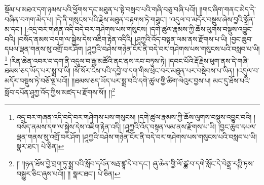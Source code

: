 སྡོམ་པ་མཐའ་དག་ཉམས་པའི་ཕྱོགས་དང་མཐུན་པ་སྟེ་བསླབ་པའི་གཞི་བཅུ་བཞི་པའོ།། །།གང་ཞིག་གནང་མེད་དེ་བཞིན་བཀག་མེད་པ། །དེ་ནི་གསུངས་པའི་རྗེས་མཐུན་བརྟགས་ཏེ་གཟུང་། །འདུལ་བ་མདོར་བསྡུས་ཞེས་བྱའི་སྒྲོན་མ་དང་། །:འདྲ་བར་གཞན་འདི་བདེ་བར་གཤེགས་པས་གསུངས། །དགེ་ཚུལ་རྣམས་ཀྱི་ཆོས་ལུགས་བསྡུས་འབྱུང་བའི། །བསོད་ནམས་བདག་ལ་སྐྱེས་དེས་འཇིག་རྟེན་འདིའི། །ཤཱཀྱའི་འོད་བསྟན་ལམ་ནས་རྫོགས་པ་ཡི། །བྱང་ཆུབ་དཔལ་ལྡན་གནས་སུ་འགྲོ་བར་ཤོག །ཤཱཀྱའི་བཤེས་གཉེན་ངོར་ནི་བདེ་བར་གཤེགས་པས་གསུངས་པའི་བསླབ་པ་ཡི།\footnote{འདྲ་བར་གཞན་འདི་བདེ་བར་གཤེགས་པས་གསུངས། །དགེ་ཚུལ་རྣམས་ཀྱི་ཆོས་ལུགས་བསྡུས་འབྱུང་བའི། །བསོད་ནམས་དག་ལ་སྐྱེས་དེས་འཇིག་རྟེན་འདི། །ཤཱཀྱའི་འོད་བསྟན་ལམ་ནས་རྫོགས་པ་ཡི། །བྱང་ཆུབ་དཔལ་ལྡན་གནས་སུ་འགྲོ་བར་ཤོག །ཤཱཀྱའི་བཤེས་གཉེན་ངོར་ནི་བདེ་བར་གཤེགས་པས་གསུངས་པའི་བསླབ་པ་ཡི།  སྣར་ཐང་།  པེ་ཅིན། } །རིན་ཆེན་འབར་བ་དག་ནི་འདུལ་བ་རྒྱ་མཚོའི་ནང་ནས་རབ་བཏུས་ཏེ། །དབང་པོའི་རྡོ་རྗེས་ཕུག་ནས་དེ་གཞི་ཐམས་ཅད་ཡོད་པར་སྨྲ་བ་ཡི། །སོ་སོར་ངེས་པའི་དབྱེ་བ་དག་གིས་ཕྲེང་བར་མཐུན་པར་བསྡེབས་པ་ཡིན། །འདུལ་བ་མདོར་བསྡུས་ཏེ་བཅོ་ལྔ་པའོ།། །།ཐམས་ཅད་ཡོད་པར་སྨྲ་བའི་དགེ་ཚུལ་གྱི་ཚིག་ལེའུར་བྱས་པ། མང་དུ་ཐོས་པའི་སློབ་དཔོན་ཤཱཀྱ་འོད་ཀྱིས་མཛད་པ་རྫོགས་སོ།། །།\footnote{།། །།ཉན་ཐོས་བྱེ་བྲག་ཏུ་སྨྲ་བའི་སློབ་དཔོན་སརྦ་ཛྙཱ་དེ་བ་དང་། ཞུ་ཆེན་གྱི་ལོ་ཙྪ་བ་དགེ་སློང་དེ་བེནྡྲ་རཀྵི་ཏས་བསྒྱུར་ཅིང་ཞུས་པའོ།། །།  སྣར་ཐང་།  པེ་ཅིན། }